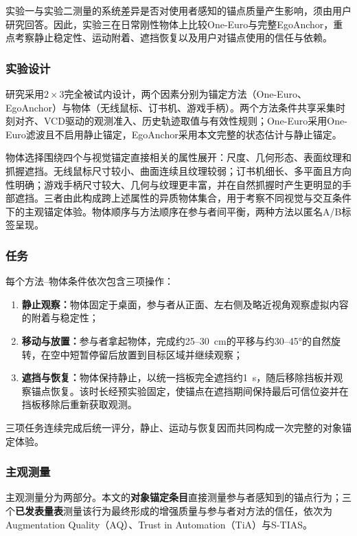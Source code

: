 \documentclass[review]{vgtc}
\begin{document}
实验一与实验二测量的系统差异是否对使用者感知的锚点质量产生影响，须由用户研究回答。因此，实验三在日常刚性物体上比较One-Euro与完整EgoAnchor，重点考察静止稳定性、运动附着、遮挡恢复以及用户对锚点使用的信任与依赖。

\subsubsection{实验设计}

研究采用$2 \times 3$完全被试内设计，两个因素分别为锚定方法（One-Euro、EgoAnchor）与物体（无线鼠标、订书机、游戏手柄）。两个方法条件共享采集时刻对齐、VCD驱动的观测准入、历史轨迹取值与有效性规则；One-Euro采用One-Euro滤波且不启用静止锚定，EgoAnchor采用本文完整的状态估计与静止锚定。

物体选择围绕四个与视觉锚定直接相关的属性展开：尺度、几何形态、表面纹理和抓握遮挡。无线鼠标尺寸较小、曲面连续且纹理较弱；订书机细长、多平面且方向性明确；游戏手柄尺寸较大、几何与纹理更丰富，并在自然抓握时产生更明显的手部遮挡。三者由此构成跨上述属性的异质物体集合，用于考察不同视觉与交互条件下的主观锚定体验。物体顺序与方法顺序在参与者间平衡，两种方法以匿名A/B标签呈现。

\subsubsection{任务}

每个方法--物体条件依次包含三项操作：
\begin{enumerate}[leftmargin=1.8em,label=(\arabic*),itemsep=1pt,topsep=2pt]
  \item \textbf{静止观察：}物体固定于桌面，参与者从正面、左右侧及略近视角观察虚拟内容的附着与稳定性；
  \item \textbf{移动与放置：}参与者拿起物体，完成约25--30~cm的平移与约30--45°的自然旋转，在空中短暂停留后放置到目标区域并继续观察；
  \item \textbf{遮挡与恢复：}物体保持静止，以统一挡板完全遮挡约1~s，随后移除挡板并观察锚点恢复。该时长经预实验固定，使锚点在遮挡期间保持最后可信位姿并在挡板移除后重新获取观测。
\end{enumerate}

三项任务连续完成后统一评分，静止、运动与恢复因而共同构成一次完整的对象锚定体验。

\subsubsection{主观测量}

主观测量分为两部分。本文的\textbf{对象锚定条目}直接测量参与者感知到的锚点行为；三个\textbf{已发表量表}测量该行为最终形成的增强质量与参与者对方法的信任，依次为Augmentation Quality（AQ）、Trust in Automation（TiA）与S-TIAS。
\end{document}
